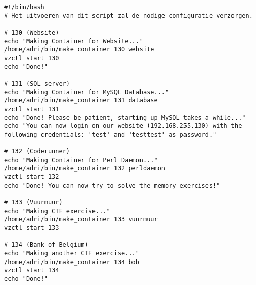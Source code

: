 \begin{lstlisting}
#!/bin/bash
# Het uitvoeren van dit script zal de nodige configuratie verzorgen.
    
# 130 (Website)
echo "Making Container for Website..."
/home/adri/bin/make_container 130 website
vzctl start 130
echo "Done!"
    
# 131 (SQL server)
echo "Making Container for MySQL Database..."
/home/adri/bin/make_container 131 database
vzctl start 131
echo "Done! Please be patient, starting up MySQL takes a while..."
echo "You can now login on our website (192.168.255.130) with the following credentials: 'test' and 'testtest' as password."
    
# 132 (Coderunner)
echo "Making Container for Perl Daemon..."
/home/adri/bin/make_container 132 perldaemon
vzctl start 132
echo "Done! You can now try to solve the memory exercises!"
    
# 133 (Vuurmuur)
echo "Making CTF exercise..."
/home/adri/bin/make_container 133 vuurmuur
vzctl start 133
   
# 134 (Bank of Belgium)
echo "Making another CTF exercise..."
/home/adri/bin/make_container 134 bob
vzctl start 134
echo "Done!"
\end{lstlisting}